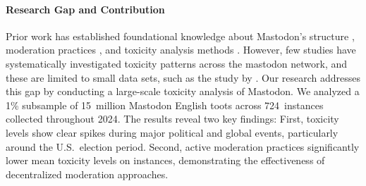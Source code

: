 \paragraph{Research Gap and Contribution}
Prior work has established foundational knowledge about Mastodon's structure \cite{zulli:2020,la_cava:2021}, moderation practices \cite{bono:2024,nicholson:2023}, and toxicity analysis methods \cite{fan:2022}. However, few studies have systematically investigated toxicity patterns across the mastodon network, and these are limited to small data sets, such as the study by \citet{al-khateeb:2022}. Our research addresses this gap by conducting a large-scale toxicity analysis of Mastodon. We analyzed a 1\% subsample of 15~million Mastodon English toots across 724~instances collected throughout 2024. The results reveal two key findings: First, toxicity levels show clear spikes during major political and global events, particularly around the U.S.~election period. Second, active moderation practices significantly lower mean toxicity levels on instances, demonstrating the effectiveness of decentralized moderation approaches.

\enlargethispage{\baselineskip}